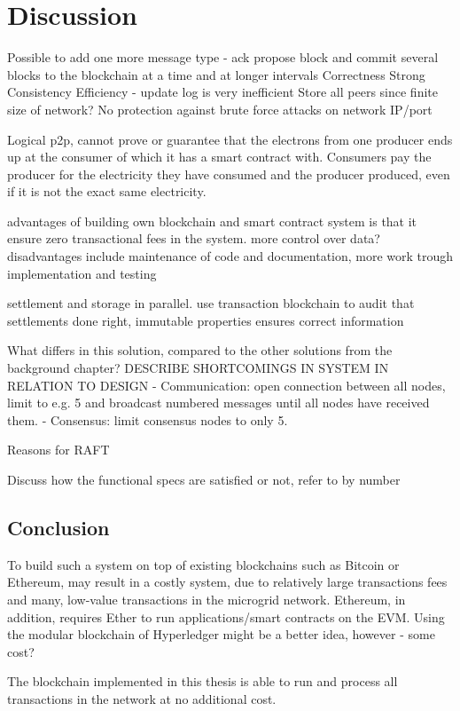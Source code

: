 \chapter{Discussion}
Possible to add one more message type - ack propose block and commit several blocks to the blockchain at a time and at longer intervals
Correctness
Strong Consistency
Efficiency - update log is very inefficient
Store all peers since finite size of network?
No protection against brute force attacks on network IP/port 

Logical p2p, cannot prove or guarantee that the electrons from one producer ends up at the consumer of which it has a smart contract with. Consumers pay the producer for the electricity they have consumed and the producer produced, even if it is not the exact same electricity.

advantages of building own blockchain and smart contract system is that it ensure zero transactional fees in the system. more control over data?
disadvantages include maintenance of code and documentation, more work trough implementation and testing

settlement and storage in parallel. use transaction blockchain to audit that settlements done right, immutable properties ensures correct information

What differs in this solution, compared to the other solutions from the background chapter?
DESCRIBE SHORTCOMINGS IN SYSTEM IN RELATION TO DESIGN
 - Communication: open connection between all nodes, limit to e.g. 5 and broadcast numbered messages until all nodes have received them. 
 - Consensus: limit consensus nodes to only 5. 
 
Reasons for RAFT

Discuss how the functional specs are satisfied or not, refer to by number


  

\section{Conclusion}
To build such a system on top of existing blockchains such as Bitcoin or Ethereum, may result in a costly system, due to relatively large transactions fees and many, low-value transactions in the microgrid network. Ethereum, in addition, requires Ether to run applications/smart contracts on the EVM. Using the modular blockchain of Hyperledger might be a better idea, however - some cost?

The blockchain implemented in this thesis is able to run and process all transactions in the network at no additional cost.


